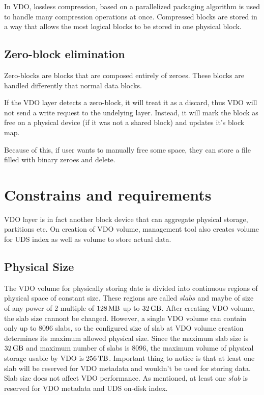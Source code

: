 \documentclass[
  color, %
  table, %
  lof,   %
  lot,   %
]{fithesis3}
\begin{document}
In VDO, lossless compression, based on a parallelized packaging algorithm is used to handle many compression operations at once. Compressed blocks are stored in a way that allows the most logical blocks to be stored in one physical block.


\subsection{Zero-block elimination}
Zero-blocks are blocks that are composed entirely of zeroes. These blocks are handled differently that normal data blocks.

If the VDO layer detects a zero-block, it will treat it as a discard, thus VDO will not send a write request to the undelying layer. Instead, it will mark the block as free on a physical device (if it was not a shared block) and updates it's block map.

Because of this, if user wants to manually free some space, they can store a file filled with binary zeroes and delete.


\section{Constrains and requirements}
VDO layer is in fact another block device that can aggregate physical storage, partitions etc. On creation of VDO volume, management tool also creates volume for UDS index as well as volume to store actual data.

\subsection{Physical Size}
The VDO volume for physically storing date is divided into continuous regions of physical space of constant size. These regions are called $slabs$ and maybe of size of any power of 2 multiple of $\SI{128}{\mega\byte}$  up to $\SI{32}{\giga\byte}$. After creating VDO volume, the slab size cannont be changed. However, a single VDO volume can contain only up to 8096 slabs, so the configured size of slab at VDO volume creation determines its maximum allowed physical size. Since the maximum slab size is $\SI{32}{\giga\byte}$ and maximum number of slabs is 8096, the maximum volume of physical storage usable by VDO is $\SI{256}{\tera\byte}$. Important thing to notice is that at least one slab will be reserved for VDO metadata and wouldn't be used for storing data. Slab size does not affect VDO performance. As mentioned, at least one $slab$ is reserved for VDO metadata and UDS on-disk index.
\end{document}
